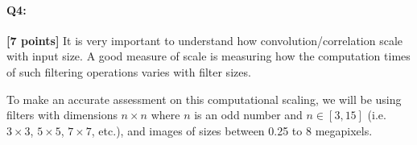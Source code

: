\documentclass[11pt]{article}
\begin{document}

\pagebreak
\paragraph{Q4:} \textbf{[7 points]}
    It is very important to understand how convolution/correlation scale with input size. A good measure of scale is measuring how the computation times of such filtering operations varies with filter sizes.
    
    To make an accurate assessment on this computational scaling, we will be using filters with dimensions $n \times n$ where $n$ is an odd number and $n \in [3, 15]$ (i.e. $3\times3$, $5\times5$, $7\times7$, etc.), and images of sizes between 0.25 to 8 megapixels.
\end{document}
